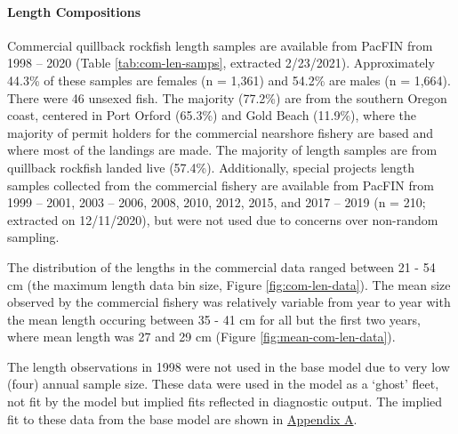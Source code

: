 \documentclass[11pt,
  english,
  a4paper,
]{article}
\begin{document}
\leavevmode\tagmcend\tagstructend\par


\hypertarget{length-compositions}{%
\paragraph{Length Compositions}\label{length-compositions}}

\leavevmode\tagmcend\tagstructend


Commercial quillback rockfish length samples are available from PacFIN from 1998 -- 2020 (Table \ref{tab:com-len-samps}, extracted 2/23/2021). Approximately 44.3\% of these samples are females (n = 1,361) and 54.2\% are males (n = 1,664). There were 46 unsexed fish. The majority (77.2\%) are from the southern Oregon coast, centered in Port Orford (65.3\%) and Gold Beach (11.9\%), where the majority of permit holders for the commercial nearshore fishery are based and where most of the landings are made. The majority of length samples are from quillback rockfish landed live (57.4\%). Additionally, special projects length samples collected from the commercial fishery are available from PacFIN from 1999 -- 2001, 2003 -- 2006, 2008, 2010, 2012, 2015, and 2017 -- 2019 (n = 210; extracted on 12/11/2020), but were not used due to concerns over non-random sampling.

\leavevmode\tagmcend\tagstructend\par


The distribution of the lengths in the commercial data ranged between 21 - 54 cm (the maximum length data bin size, Figure \ref{fig:com-len-data}). The mean size observed by the commercial fishery was relatively variable from year to year with the mean length occuring between 35 - 41 cm for all but the first two years, where mean length was 27 and 29 cm (Figure \ref{fig:mean-com-len-data}).

\leavevmode\tagmcend\tagstructend\par


The length observations in 1998 were not used in the base model due to very low (four) annual sample size. These data were used in the model as a `ghost' fleet, not fit by the model but implied fits reflected in diagnostic output. The implied fit to these data from the base model are shown in {\protect\hyperlink{append_a}{Appendix A}\leavevmode\tagmcend\tagstructend}.
\end{document}
